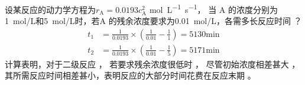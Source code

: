 \documentclass[dvipsnames, svgnames, x11names]{beamer}
\begin{document}
\begin{frame}[t]
    \frametitle{}
    \begin{example}
        设某反应的动力学方程为$r_\mathrm{A}=0.0193c_\mathrm{A}^2$ \si{mol.L^{-1}.s^{-1}}， 当 A 的浓度分别为\SI{1}{mol/L}和\SI{5}{mol/L}时，若A 的残余浓度要求为\SI{0.01}{mol/L}，各需多长反应时间 ？
    \tcblower
    \pause
    \[
        \begin{aligned}
            t_{1}&=\frac{1}{0.0193}\times\left(\frac{1}{0.01}-\frac{1}{1}\right)=5130\mathrm{min}\\
            t_{2}&=\frac{1}{0.0193}\times\left(\frac{1}{0.01}-\frac{1}{5}\right)=5171\mathrm{min}
        \end{aligned}
    \]
    \pause
    计算表明，对于二级反应 ， 若要求残余浓度很低时 ， 尽管初始浓度相差甚大 ， 其所需反应时间相差甚小，表明反应的大部分时间花费在反应末期 。
    \end{example}
\end{frame}


\end{document}
